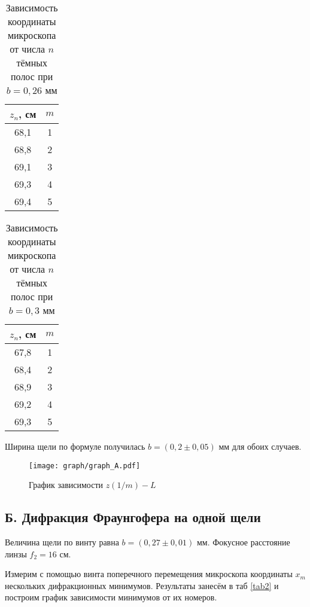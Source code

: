 \documentclass[a4paper,12pt]{article}
\begin{document}
\begin{table}[!h]
	\caption{Зависимость координаты микроскопа от числа $ n $ тёмных полос при $b = 0,26$ мм}
	\label{table1}	
	\begin{center}
		\begin{tabular}{|c|c|}
			\hline
			$z_n$, см & $m$ \\ \hline
			68,1	&	1 \\ \hline
			68,8	&	2 \\ \hline
			69,1	&	3 \\ \hline
			69,3	&	4 \\ \hline
			69,4	&	5 \\ \hline
		\end{tabular}
	\end{center}
\end{table}


\begin{table}[!h]
	\caption{Зависимость координаты микроскопа от числа $ n $ тёмных полос при $b = 0,3$ мм}
	\label{table1}	
	\begin{center}
		\begin{tabular}{|c|c|}
			\hline
			$z_n$, см & $m$ \\ \hline
			67,8	&	1 \\ \hline
			68,4	&	2 \\ \hline
			68,9	&	3 \\ \hline
			69,2	&	4 \\ \hline
			69,3	&	5 \\ \hline
		\end{tabular}
	\end{center}
\end{table}


Ширина щели по формуле получилась $b = (0,2 \pm 0,05)$ мм для обоих случаев.

\FloatBarrier
\begin{figure}[!h]
    \centering
    \texttt{[image: graph/graph\_A.pdf]}
    \caption{График зависимости $z(1/m) - L$}
    \label{fig:graph-A}
\end{figure}
\FloatBarrier


\subsection*{Б. Дифракция Фраунгофера на одной щели}

Величина щели по винту равна $ b = (0,27\pm0,01)$ мм. Фокусное расстояние линзы $ f_2 = 16$ см.

Измерим с помощью винта поперечного перемещения микроскопа координаты $ x_m $ нескольких дифракционных минимумов.
Результаты занесём в таб \ref{tab2} и построим график зависимости минимумов от их номеров. 
\end{document}
